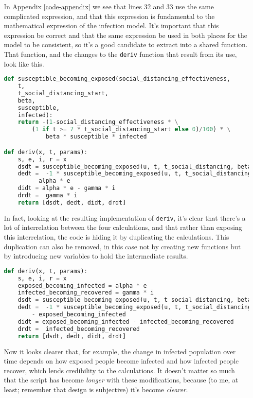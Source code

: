 \documentclass[a4paper]{article}
\begin{document}
In Appendix \ref{code-appendix} we see that lines 32 and 33 use the same complicated expression, and that this expression is fundamental to the mathematical expression of the infection model.
It's important that this expression be correct and that the same expression be used in both places for the model to be consistent, so it's a good candidate to extract into a shared function.
That function, and the changes to the \texttt{deriv} function that result from its use, look like this.

\begin{lstlisting}[language=Python]
def susceptible_becoming_exposed(social_distancing_effectiveness, 
    t,
    t_social_distancing_start,
    beta,
    susceptible,
    infected):
    return -(1-social_distancing_effectiveness * \
        (1 if t >= 7 * t_social_distancing_start else 0)/100) * \
            beta * susceptible * infected

def deriv(x, t, params):
    s, e, i, r = x
    dsdt = susceptible_becoming_exposed(u, t, t_social_distancing, beta, s, i)
    dedt =  -1 * susceptible_becoming_exposed(u, t, t_social_distancing, beta, s, i)\
        - alpha * e
    didt = alpha * e - gamma * i
    drdt =  gamma * i
    return [dsdt, dedt, didt, drdt]
\end{lstlisting}

In fact, looking at the resulting implementation of \texttt{deriv}, it's clear that there's a lot of interrelation between the four calculations, and that rather than exposing this interrelation, the code is hiding it by duplicating the calculations.
This duplication can also be removed, in this case not by creating new functions but by introducing new variables to hold the intermediate results.

\begin{lstlisting}[language=Python]
def deriv(x, t, params):
    s, e, i, r = x
    exposed_becoming_infected = alpha * e
    infected_becoming_recovered = gamma * i
    dsdt = susceptible_becoming_exposed(u, t, t_social_distancing, beta, s, i)
    dedt =  -1 * susceptible_becoming_exposed(u, t, t_social_distancing, beta, s, i)\
        - exposed_becoming_infected
    didt = exposed_becoming_infected - infected_becoming_recovered
    drdt =  infected_becoming_recovered
    return [dsdt, dedt, didt, drdt]
\end{lstlisting}

Now it looks clearer that, for example, the change in infected population over time depends on how exposed people become infected and how infected people recover, which lends credibility to the calculations.
It doesn't matter so much that the script has become \emph{longer} with these modifications, because (to me, at least; remember that design is subjective) it's become \emph{clearer}.
\end{document}
